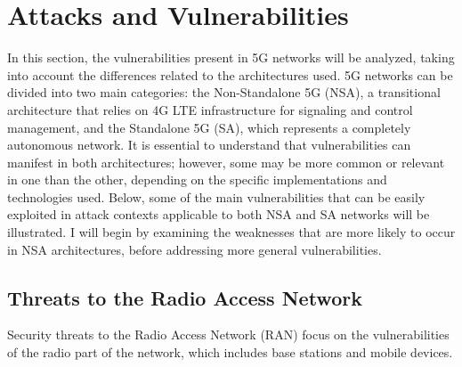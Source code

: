 \documentclass[english]{article}
\begin{document}
\section{Attacks and Vulnerabilities}\label{sec:5}
In this section, the vulnerabilities present in 5G networks will be analyzed,
taking into account the differences related to the architectures used. 5G
networks can be divided into two main categories: the Non-Standalone 5G (NSA),
a transitional architecture that relies on 4G LTE infrastructure for signaling
and control management, and the Standalone 5G (SA), which represents a
completely autonomous network. It is essential to understand that
vulnerabilities can manifest in both architectures; however, some may be more
common or relevant in one than the other, depending on the specific
implementations and technologies used. Below, some of the main vulnerabilities
that can be easily exploited in attack contexts applicable to both NSA and SA
networks will be illustrated. I will begin by examining the weaknesses that are
more likely to occur in NSA architectures, before addressing more general
vulnerabilities.

\subsection{Threats to the Radio Access Network}
Security threats to the Radio Access Network (RAN) focus on the vulnerabilities
of the radio part of the network, which includes base stations and mobile
devices. \\[0.2cm]
\end{document}
